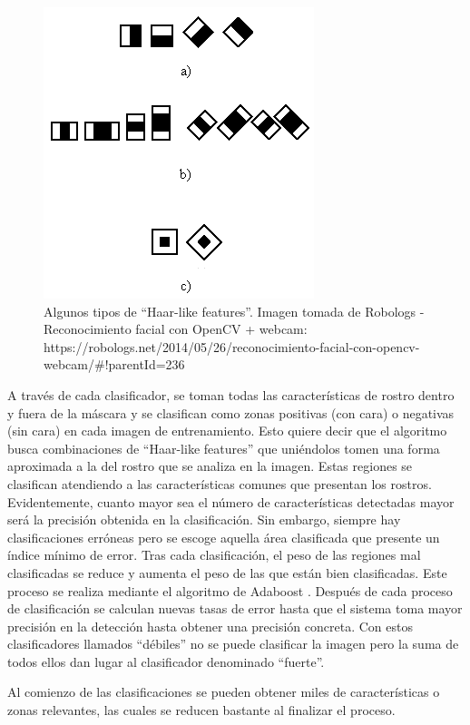 \begin{figure}
\centering
\includegraphics[scale = 0.7]{capitulo_02/figuras_dir/mascaras.jpg}
\caption{Algunos tipos de ``Haar-like features''. Imagen tomada de Robologs - Reconocimiento facial con OpenCV + webcam: https://robologs.net/2014/05/26/reconocimiento-facial-con-opencv-webcam/\#!parentId=236}
\end{figure}

A través de cada clasificador, se toman todas las características de rostro dentro y fuera de la máscara y se clasifican como zonas positivas (con cara) o negativas (sin cara) en cada imagen de entrenamiento. Esto quiere decir que el algoritmo busca combinaciones de ``Haar-like features'' \citep{opencvhaar} que uniéndolos tomen una forma aproximada a la del rostro que se analiza en la imagen. Estas regiones se clasifican atendiendo a las características comunes que presentan los rostros. Evidentemente, cuanto mayor sea el número de características detectadas mayor será la precisión obtenida en la clasificación. Sin embargo, siempre hay clasificaciones erróneas pero se escoge aquella área clasificada que presente un índice mínimo de error. Tras cada clasificación, el peso de las regiones mal clasificadas se reduce y aumenta el peso de las que están bien clasificadas. Este proceso se realiza mediante el algoritmo de Adaboost \citep{opencvorg}. Después de cada proceso de clasificación se calculan nuevas tasas de error hasta que el sistema toma mayor precisión en la detección hasta obtener una precisión concreta. Con estos clasificadores llamados ``débiles'' no se puede clasificar la imagen pero la suma de todos ellos dan lugar al clasificador denominado ``fuerte''. 

Al comienzo de las clasificaciones se pueden obtener miles de características o zonas relevantes, las cuales se reducen bastante al finalizar el proceso.

